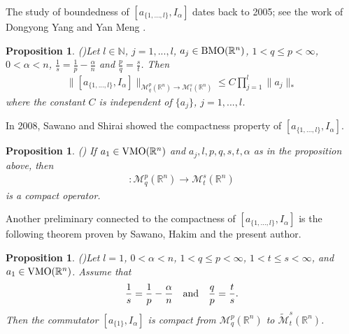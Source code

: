 \documentclass[11pt,a4]{article}
\numberwithin{equation}{section}
\newtheorem{proposition}[theorem]{Proposition}
\theoremstyle{definition}
\theoremstyle{remark}
\begin{document}
The study of boundedness of $[a_{\{1, ... ,l\}},I_{\alpha}]$ dates back to 2005; see the work of Dongyong Yang and Yan Meng \cite{mlc-bdd}.

\begin{proposition}{\rm (\cite{mlc-bdd})}\label{mlc-bdd}
	Let $l \in \mathbb N$, $j=1,...,l$, $a_j \in {\rm BMO}({\mathbb R}^n)$, $1 < q \le p < \infty$, $0 < \alpha < n$, $\frac{1}{s}=\frac{1}{p}-\frac{\alpha}{n}$ and $\frac{p}{q}=\frac{s}{t}$. Then
	\begin{align*}
		\| [a_{\{1, ... ,l\}},I_{\alpha}] \|_{{\mathcal M}^{p}_q({\mathbb R}^n) \rightarrow {\mathcal M}^{s}_t({\mathbb R}^n)}
		\le C \prod_{j=1}^l \|a_j\|_*
	\end{align*}
	where the constant $C$ is independent of $\{a_j\}$, $j=1,...,l$.

\end{proposition}

In 2008, Sawano and Shirai showed the compactness property of $[a_{\{1, ... ,l\}},I_{\alpha}]$.

\begin{proposition}{\rm (\cite{mlc-cpt})}
	If $a_1 \in {\rm VMO}({\mathbb R}^n)$ and $a_j,l,p,q,s,t,\alpha$ as in the proposition above, then 
	\begin{align*}
		[a_{\{1, ... ,l\}},I_{\alpha}]:{\mathcal M}^{p}_q({\mathbb R}^n) \rightarrow {\mathcal M}^{s}_t({\mathbb R}^n)
	\end{align*}
	is a compact operator.
\end{proposition}

Another preliminary connected to the compactness of $[a_{\{1, ... ,l\}},I_{\alpha}]$ is the following theorem proven by Sawano, Hakim and the present author.

\begin{proposition}{\rm (\cite{2025})}\label{l1}
	Let $l=1$, $0<\alpha<n$, $1<q \le p<\infty$, $1<t \le s<\infty$, and $a_1 \in {\rm VMO}({\mathbb R}^n)$. Assume that
	\[
		\frac{1}{s}=\frac{1}{p}-\frac{\alpha}{n}  \quad {\rm and}\quad \frac{q}{p}=\frac{t}{s}.
	\]
	Then the commutator $[a_{\{1\}},I_\alpha]$ is compact from ${\mathcal M}^p_q({\mathbb R}^n)$ to $\widetilde{\mathcal M}^s_t({\mathbb R}^n)$.
\end{proposition}










\end{document}

